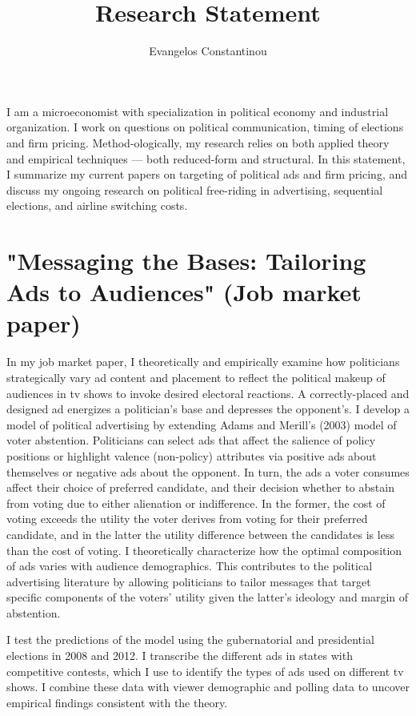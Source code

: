 \documentclass[12pt]{article}
\author{Evangelos Constantinou}
\date{}
\title{\bf{Research Statement}}
\begin{document}
\maketitle
I am a microeconomist with specialization in political economy and industrial organization.
I work on questions on political communication, timing of elections and firm pricing.
Method-ologically, my research relies on both applied theory and empirical techniques --- both reduced-form and structural.
In this statement, I summarize my current papers on targeting of political ads and firm pricing, and discuss my ongoing research on political free-riding in advertising, sequential elections, and airline switching costs.

\vspace{0.25cm}

\section{"Messaging the Bases: Tailoring Ads to Audiences" (Job market paper)}
\label{sec:orgbf5b8d9}
\vspace{0.1cm}

\noindent
In my job market paper, I theoretically and empirically examine how politicians strategically vary ad content and placement to reflect the political makeup of audiences in tv shows to invoke desired electoral reactions.
A correctly-placed and designed ad energizes a politician's base and depresses the opponent's.
I develop a model of political advertising by extending Adams and Merill's (2003) model of voter abstention.
Politicians can select ads that affect the salience of policy positions or highlight valence (non-policy) attributes via positive ads about themselves or negative ads about the opponent.
In turn, the ads a voter consumes affect their choice of preferred candidate, and their decision whether to abstain from voting due to either alienation or indifference.
In the former, the cost of voting exceeds the utility the voter derives from voting for their preferred candidate, and in the latter the utility difference between the candidates is less than the cost of voting.
I theoretically characterize  how the optimal composition of ads varies with audience demographics.
This contributes to the political advertising literature by allowing politicians to tailor messages that target specific components of the voters' utility given the latter's ideology and margin of abstention.

I test the predictions of the model using the gubernatorial and presidential elections in 2008 and 2012.
I transcribe the different ads in states with competitive contests, which I use to identify the types of ads used on different tv shows.
I combine these data with viewer demographic and polling data to uncover empirical findings consistent with the theory.
\end{document}
